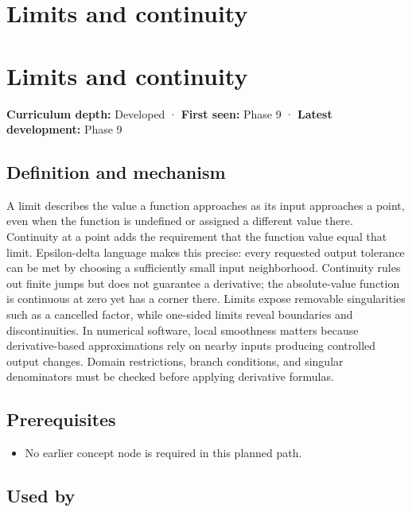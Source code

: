 \hypertarget{appendix-fecc1847f5a3}{}
\section*{Limits and continuity}
\section{Limits and continuity}\label{limits-and-continuity}

\textbf{Curriculum depth:} Developed · \textbf{First seen:} Phase 9 · \textbf{Latest development:} Phase 9

\subsection{Definition and mechanism}\label{definition-and-mechanism}

A limit describes the value a function approaches as its input approaches a point, even when the function is undefined or assigned a different value there. Continuity at a point adds the requirement that the function value equal that limit. Epsilon-delta language makes this precise: every requested output tolerance can be met by choosing a sufficiently small input neighborhood. Continuity rules out finite jumps but does not guarantee a derivative; the absolute-value function is continuous at zero yet has a corner there. Limits expose removable singularities such as a cancelled factor, while one-sided limits reveal boundaries and discontinuities. In numerical software, local smoothness matters because derivative-based approximations rely on nearby inputs producing controlled output changes. Domain restrictions, branch conditions, and singular denominators must be checked before applying derivative formulas.

\subsection{Prerequisites}\label{prerequisites}

\begin{itemize}
\tightlist
\item
  No earlier concept node is required in this planned path.
\end{itemize}

\subsection{Used by}\label{used-by}

